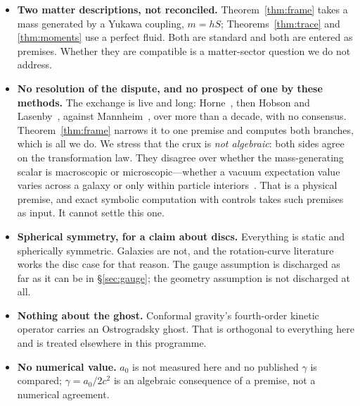 \documentclass[11pt]{article}
\theoremstyle{definition}
\theoremstyle{remark}
\begin{document}
\begin{itemize}
  are not solved.  Nor is it shown that a cosmological boundary condition
  \emph{can} deliver a universal \(\gamma_{0}\).  Above all,
  Corollary~\ref{cor:inequality} is not evaluated: whether
  \(\gamma_{*}\ll\gamma_{0}\) holds for real galaxies is observational and we
  do not measure it.  The assumption is named and sharpened, not discharged.
\item \textbf{Two matter descriptions, not reconciled.}
  Theorem~\ref{thm:frame} takes a mass generated by a Yukawa coupling,
  \(m=hS\); Theorems~\ref{thm:trace} and \ref{thm:moments} use a perfect
  fluid.  Both are standard and both are entered as premises.  Whether they
  are compatible is a matter-sector question we do not address.
\item \textbf{No resolution of the dispute, and no prospect of one by these
  methods.}  The exchange is live and long: Horne~\cite{Horne2016}, then
  Hobson and Lasenby~\cite{HobsonLasenby2021,HobsonLasenby2022}, against
  Mannheim~\cite{Mannheim2006,Mannheim2022}, over more than a decade, with no
  consensus.  Theorem~\ref{thm:frame} narrows it to one premise and computes
  both branches, which is all we do.  We stress that the crux is \emph{not
  algebraic}: both sides agree on the transformation law.  They disagree over
  whether the mass-generating scalar is macroscopic or microscopic---whether a
  vacuum expectation value varies across a galaxy or only within particle
  interiors~\cite{Mannheim2022}.  That is a physical premise, and exact
  symbolic computation with controls takes such premises as input.  It cannot
  settle this one.
\item \textbf{Spherical symmetry, for a claim about discs.}  Everything is
  static and spherically symmetric.  Galaxies are not, and the rotation-curve
  literature works the disc case for that reason.  The gauge assumption is
  discharged as far as it can be in \S\ref{sec:gauge}; the geometry assumption
  is not discharged at all.
\item \textbf{Nothing about the ghost.}  Conformal gravity's fourth-order
  kinetic operator carries an Ostrogradsky ghost.  That is orthogonal to
  everything here and is treated elsewhere in this programme.
\item \textbf{No numerical value.}  \(a_{0}\) is not measured here and no
  published \(\gamma\) is compared; \(\gamma=a_{0}/2c^{2}\) is an algebraic
  consequence of a premise, not a numerical agreement.
\end{itemize}
\end{document}
